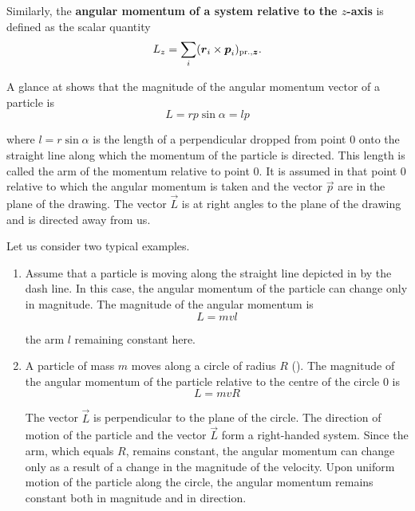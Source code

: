 \noindent
Similarly, the \textbf{angular momentum of a system relative to the $z$-axis} is defined as the scalar quantity
\begin{equation}\label{eq:3_108}
L_z = \sum_i (\boldsymbol{r}_{i}\times\boldsymbol{p}_{i})_{\text{pr.},\boldsymbol{z}}.
\end{equation}


\noindent
A glance at  shows that the magnitude of the angular momentum vector of a particle is
\begin{equation}\label{eq:3_109}
L = rp\sin\alpha = lp
\end{equation}

\noindent
where $l=r\sin\alpha$ is the length of a perpendicular dropped from point $0$ onto the straight line along which the momentum of the particle is directed. This length is called the arm of the momentum relative to point $0$. It is assumed in  that point $0$ relative to which the angular momentum is taken and the vector $\vec{p}$ are in the plane of the drawing. The vector $\vec{L}$ is at right angles to the plane of the drawing and is directed away from us.

Let us consider two typical examples.
\begin{enumerate}[1.]
	\item Assume that a particle is moving along the straight line depicted in  by the dash line. In this case, the angular momentum 	of the particle can change only in magnitude. The magnitude of the angular momentum is
	\begin{equation}\label{eq:3_110}
	L = mvl
	\end{equation}
	
	\noindent
	the arm $l$ remaining constant here.
	\item A particle of mass $m$ moves along a circle of radius $R$ (). The magnitude of the angular momentum of the particle relative to the centre of the circle $0$ is
	\begin{equation}\label{eq:3_111}
	L = mvR
	\end{equation}
	
	\noindent
	The vector $\vec{L}$ is perpendicular to the plane of the circle. The direction of motion of the particle and the vector $\vec{L}$ form a right-handed system. Since the arm, which equals $R$, remains constant, the angular momentum can change only as a result of a change in the magnitude of the velocity. Upon uniform motion of the particle along the circle, the angular momentum remains constant both in magnitude and in direction.
\end{enumerate}

